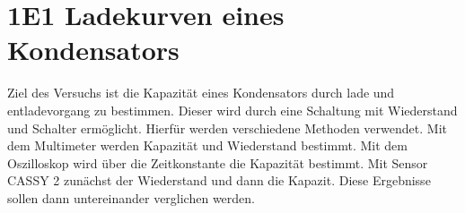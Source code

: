 \documentclass[twoside]{protokoll}
\begin{document}
\begin{versuchsziele}
\end{versuchsziele}

\section{1E1 Ladekurven eines Kondensators}


\begin{versuchsziele}
Ziel des Versuchs ist die Kapazität eines Kondensators durch lade und entladevorgang
zu bestimmen. 
Dieser wird durch eine Schaltung mit Wiederstand und Schalter ermöglicht.
Hierfür werden verschiedene Methoden verwendet. Mit dem Multimeter werden Kapazität
und Wiederstand bestimmt.
Mit dem Oszilloskop wird über die Zeitkonstante die Kapazität bestimmt. Mit Sensor CASSY 2 zunächst der Wiederstand und dann die Kapazit. 
Diese Ergebnisse sollen dann untereinander verglichen werden.

\end{versuchsziele}
\end{document}
